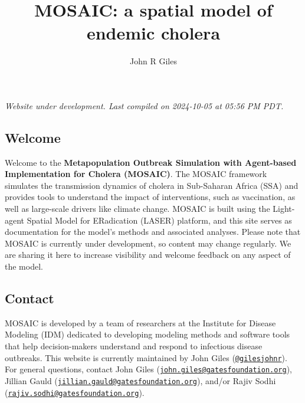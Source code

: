 \documentclass[
]{book}
\title{MOSAIC: a spatial model of endemic cholera}
\author{John R Giles}
\date{}
\begin{document}
\maketitle

{
\setcounter{tocdepth}{1}
\tableofcontents
}
\chapter*{}\label{section}

\hfill\break

{\emph{
Website under development. Last compiled on 2024-10-05 at 05:56 PM PDT.
}}

\section*{Welcome}\label{welcome}

Welcome to the \textbf{Metapopulation Outbreak Simulation with Agent-based Implementation for Cholera (MOSAIC)}. The MOSAIC framework simulates the transmission dynamics of cholera in Sub-Saharan Africa (SSA) and provides tools to understand the impact of interventions, such as vaccination, as well as large-scale drivers like climate change. MOSAIC is built using the Light-agent Spatial Model for ERadication (LASER) platform, and this site serves as documentation for the model's methods and associated analyses. Please note that MOSAIC is currently under development, so content may change regularly. We are sharing it here to increase visibility and welcome feedback on any aspect of the model.

\section*{Contact}\label{contact}

MOSAIC is developed by a team of researchers at the Institute for Disease Modeling (IDM) dedicated to developing modeling methods and software tools that help decision-makers understand and respond to infectious disease outbreaks. This website is currently maintained by John Giles (\href{https://github.com/gilesjohnr}{\texttt{@gilesjohnr}}). For general questions, contact John Giles (\href{mailto:john.giles@gatesfoundation.org}{\nolinkurl{john.giles@gatesfoundation.org}}), Jillian Gauld (\href{mailto:jillian.gauld@gatesfoundation.org}{\nolinkurl{jillian.gauld@gatesfoundation.org}}), and/or Rajiv Sodhi (\href{mailto:rajiv.sodhi@gatesfoundation.org}{\nolinkurl{rajiv.sodhi@gatesfoundation.org}}).
\end{document}
